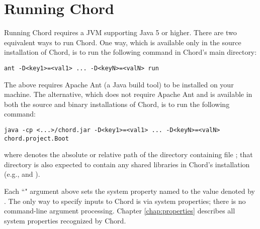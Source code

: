 \section{Running Chord}
\label{sec:running-chord}

Running Chord requires a JVM supporting Java 5 or higher.
There are two equivalent ways to run Chord.
One way, which is available only in the source installation of Chord, is to run the
following command in Chord's main directory:

\begin{framed}
\begin{verbatim}
ant -D<key1>=<val1> ... -D<keyN>=<valN> run
\end{verbatim}
\end{framed}

The above requires Apache Ant (a Java build tool) to be installed on
your machine.  The alternative, which does not require Apache Ant and is
available in both the source and binary installations of Chord, is
to run the following command:

\begin{framed}
\begin{verbatim}
java -cp <...>/chord.jar -D<key1>=<val1> ... -D<keyN>=<valN> chord.project.Boot
\end{verbatim}
\end{framed}

where  denotes the absolute or relative path of the
directory containing file ; that directory is also
expected to contain any shared libraries in Chord's installation (e.g.,
 and ).

Each ``" argument above sets the system property
named  to the value denoted by .  The only
way to specify inputs to Chord is via system properties; there is no
command-line argument processing.  Chapter \ref{chap:properties}
describes all system properties recognized by Chord.

